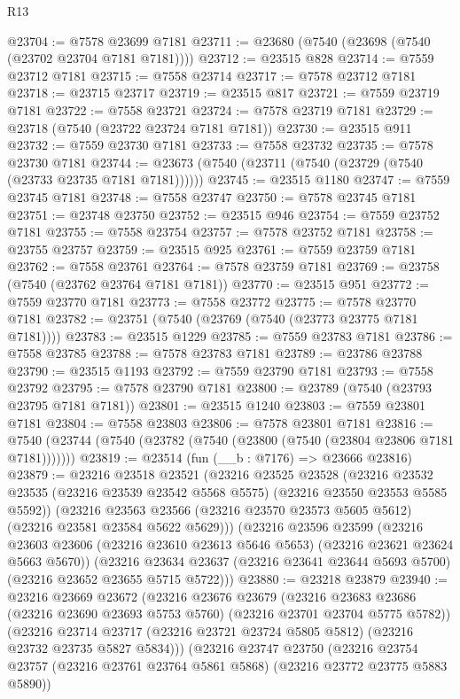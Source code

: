 \begin{lexlean}{R13}
\begin{coremodule}
@23704 := @7578 @23699 @7181
@23711 := @23680 (@7540 (@23698 (@7540 (@23702 @23704 @7181 @7181))))
@23712 := @23515 @828
@23714 := @7559 @23712 @7181
@23715 := @7558 @23714
@23717 := @7578 @23712 @7181
@23718 := @23715 @23717
@23719 := @23515 @817
@23721 := @7559 @23719 @7181
@23722 := @7558 @23721
@23724 := @7578 @23719 @7181
@23729 := @23718 (@7540 (@23722 @23724 @7181 @7181))
@23730 := @23515 @911
@23732 := @7559 @23730 @7181
@23733 := @7558 @23732
@23735 := @7578 @23730 @7181
@23744 := @23673 (@7540 (@23711 (@7540 (@23729 (@7540 (@23733 @23735 @7181 @7181))))))
@23745 := @23515 @1180
@23747 := @7559 @23745 @7181
@23748 := @7558 @23747
@23750 := @7578 @23745 @7181
@23751 := @23748 @23750
@23752 := @23515 @946
@23754 := @7559 @23752 @7181
@23755 := @7558 @23754
@23757 := @7578 @23752 @7181
@23758 := @23755 @23757
@23759 := @23515 @925
@23761 := @7559 @23759 @7181
@23762 := @7558 @23761
@23764 := @7578 @23759 @7181
@23769 := @23758 (@7540 (@23762 @23764 @7181 @7181))
@23770 := @23515 @951
@23772 := @7559 @23770 @7181
@23773 := @7558 @23772
@23775 := @7578 @23770 @7181
@23782 := @23751 (@7540 (@23769 (@7540 (@23773 @23775 @7181 @7181))))
@23783 := @23515 @1229
@23785 := @7559 @23783 @7181
@23786 := @7558 @23785
@23788 := @7578 @23783 @7181
@23789 := @23786 @23788
@23790 := @23515 @1193
@23792 := @7559 @23790 @7181
@23793 := @7558 @23792
@23795 := @7578 @23790 @7181
@23800 := @23789 (@7540 (@23793 @23795 @7181 @7181))
@23801 := @23515 @1240
@23803 := @7559 @23801 @7181
@23804 := @7558 @23803
@23806 := @7578 @23801 @7181
@23816 := @7540 (@23744 (@7540 (@23782 (@7540 (@23800 (@7540 (@23804 @23806 @7181 @7181)))))))
@23819 := @23514 (fun (__b : @7176) => @23666 @23816)
@23879 := @23216
    @23518
    @23521
    (@23216
      @23525
      @23528
      (@23216 @23532 @23535 (@23216 @23539 @23542 @5568 @5575) (@23216 @23550 @23553 @5585 @5592))
      (@23216 @23563 @23566 (@23216 @23570 @23573 @5605 @5612) (@23216 @23581 @23584 @5622 @5629)))
    (@23216
      @23596
      @23599
      (@23216 @23603 @23606 (@23216 @23610 @23613 @5646 @5653) (@23216 @23621 @23624 @5663 @5670))
      (@23216 @23634 @23637 (@23216 @23641 @23644 @5693 @5700) (@23216 @23652 @23655 @5715 @5722)))
@23880 := @23218 @23879
@23940 := @23216
    @23669
    @23672
    (@23216
      @23676
      @23679
      (@23216 @23683 @23686 (@23216 @23690 @23693 @5753 @5760) (@23216 @23701 @23704 @5775 @5782))
      (@23216 @23714 @23717 (@23216 @23721 @23724 @5805 @5812) (@23216 @23732 @23735 @5827 @5834)))
    (@23216
      @23747
      @23750
      (@23216 @23754 @23757 (@23216 @23761 @23764 @5861 @5868) (@23216 @23772 @23775 @5883 @5890))

\end{coremodule}
\end{lexlean}
